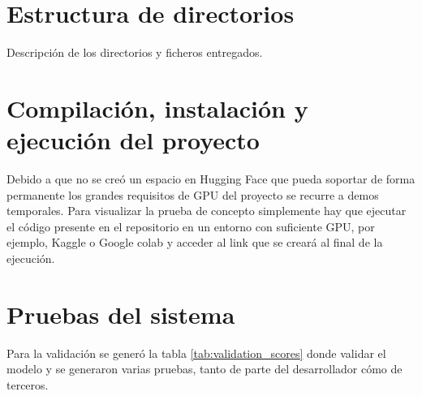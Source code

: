 

\section{Estructura de directorios}

Descripción de los directorios y ficheros entregados. %

\section{Compilación, instalación y ejecución del proyecto}

Debido a que no se creó un espacio en Hugging Face que pueda soportar de forma permanente los grandes requisitos de GPU del proyecto se recurre a demos temporales.
Para visualizar la prueba de concepto simplemente hay que ejecutar el código presente en el repositorio en un entorno con suficiente GPU, por ejemplo, Kaggle o Google colab y acceder al link que se creará al final de la ejecución.


\section{Pruebas del sistema}

Para la validación se generó la tabla \ref{tab:validation_scores} donde validar el modelo y se generaron varias pruebas, tanto de parte del desarrollador cómo de terceros.


